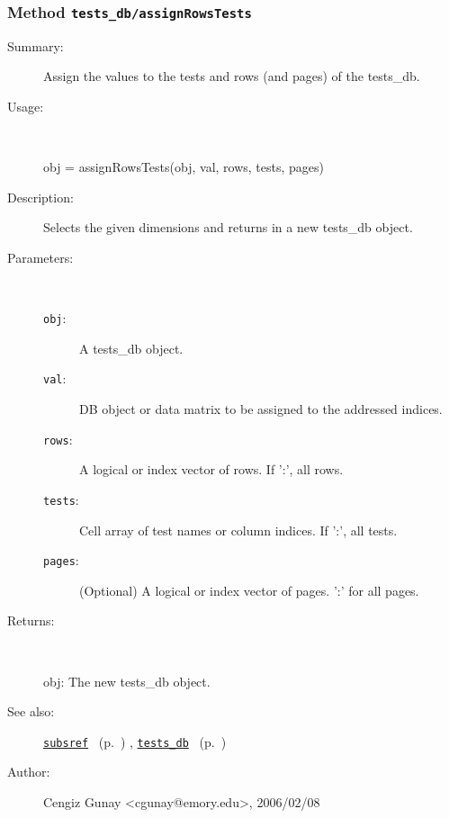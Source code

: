 \subsubsection[Method \texttt{assignRowsTests}]{Method \texttt{tests\_db/assignRowsTests}}%
%
\label{ref_tests_db__assignRowsTests}%
\hypertarget{ref_tests_db__assignRowsTests}{}%
\begin{description}
\item[Summary:]Assign the values to the tests and rows (and pages) of the tests\_db.
%
\item[Usage:]~%
\begin{lyxcode}%
obj = assignRowsTests(obj, val, rows, tests, pages)
%
\end{lyxcode}%
%
\item[Description:]%
Selects the given dimensions and returns in a new tests\_db object.
\item[Parameters:]~
\begin{description}%
\item[\texttt{obj}:]
 A tests\_db object.
\item[\texttt{val}:]
 DB object or data matrix to be assigned to the addressed indices.
\item[\texttt{rows}:]
 A logical or index vector of rows. If ':', all rows.
\item[\texttt{tests}:]
 Cell array of test names or column indices. If ':', all tests.
\item[\texttt{pages}:]
 (Optional) A logical or index vector of pages. ':' for all pages.
\end{description}%
%
\item[Returns:]~

	obj: The new tests\_db object.
%
%
\item[See also:]%
\hyperlink{ref_subsref}{\texttt{subsref}}%
\ (p.~\pageref{ref_subsref})%
%
, \hyperlink{ref_tests_db}{\texttt{tests\_db}}%
\ (p.~\pageref{ref_tests_db})%
%
%
\item[Author:]%
Cengiz Gunay <cgunay@emory.edu>, 2006/02/08%
\end{description}
\methodline%

